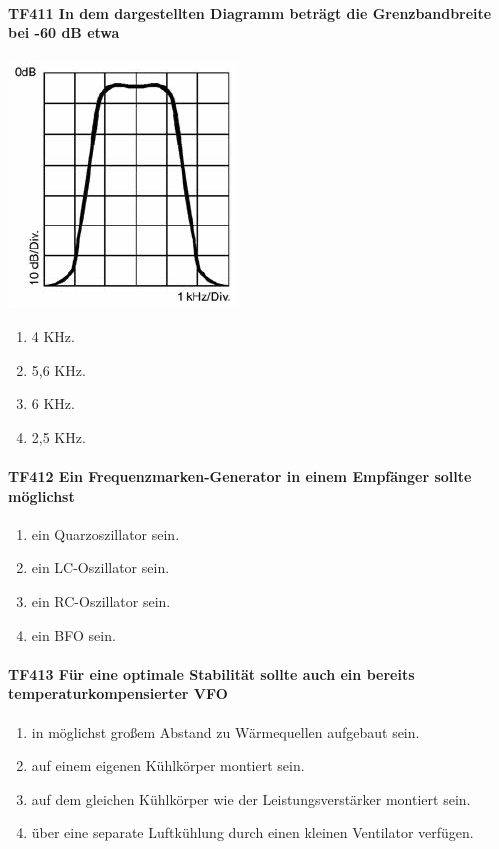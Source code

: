 \documentclass[8pt]{article}
\begin{document}
\paragraph*{TF411 In dem dargestellten Diagramm beträgt die Grenzbandbreite bei -60 dB etwa}
\begin{center}
	\begin{minipage}{\linewidth}
		\centering
		\includegraphics[scale=1.0]{pics/tf411_a.jpg}
	\end{minipage}
\end{center}
\begin{enumerate}[nolistsep,label=\Alph*]
\item 4 KHz.
\item 5,6 KHz.
\item 6 KHz.
\item 2,5 KHz.
\end{enumerate}

\paragraph*{TF412 Ein Frequenzmarken-Generator in einem Empfänger sollte möglichst} 
\begin{enumerate}[nolistsep,label=\Alph*]
\item ein Quarzoszillator sein.
\item ein LC-Oszillator sein.
\item ein RC-Oszillator sein.
\item ein BFO sein.
\end{enumerate}

\paragraph*{TF413 Für eine optimale Stabilität sollte auch ein bereits temperaturkompensierter VFO} 
\begin{enumerate}[nolistsep,label=\Alph*]
\item in möglichst großem Abstand zu Wärmequellen aufgebaut sein.
\item auf einem eigenen Kühlkörper montiert sein.
\item auf dem gleichen Kühlkörper wie der Leistungsverstärker montiert sein.
\item über eine separate Luftkühlung durch einen kleinen Ventilator verfügen.
\end{enumerate}
\end{document}
